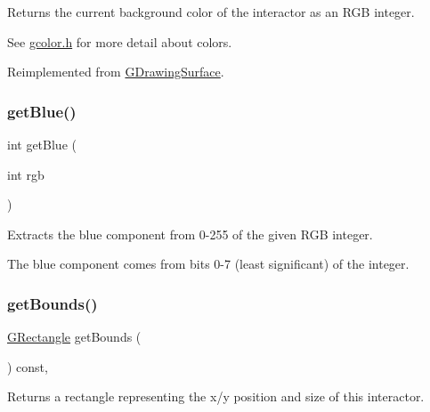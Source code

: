 Returns the current background color of the interactor as an R\+GB integer. 

See \mbox{\hyperlink{gcolor_8h_source}{gcolor.\+h}} for more detail about colors. 

Reimplemented from \mbox{\hyperlink{classsgl_1_1GDrawingSurface_a9e827257a55cb8cf4d9de2ec6bcfd7a0}{G\+Drawing\+Surface}}.

\mbox{\label{classsgl_1_1GCanvas_a9406c01e6961257db37b5dc95945f914}} 
\subsubsection{\texorpdfstring{get\+Blue()}{getBlue()}}
{\footnotesize\ttfamily int get\+Blue (\begin{DoxyParamCaption}\item[{int}]{rgb }\end{DoxyParamCaption})\hspace{0.3cm}{\ttfamily [static]}}



Extracts the blue component from 0-\/255 of the given R\+GB integer. 

The blue component comes from bits 0-\/7 (least significant) of the integer. \mbox{\label{classsgl_1_1GInteractor_a29e6ac35a0b48f491a4c88194cc5da3b}} 
\subsubsection{\texorpdfstring{get\+Bounds()}{getBounds()}}
{\footnotesize\ttfamily \mbox{\hyperlink{structsgl_1_1GRectangle}{G\+Rectangle}} get\+Bounds (\begin{DoxyParamCaption}{ }\end{DoxyParamCaption}) const\hspace{0.3cm}{\ttfamily [virtual]}, {\ttfamily [inherited]}}



Returns a rectangle representing the x/y position and size of this interactor. 

\mbox{\label{classsgl_1_1GInteractor_aa061dfa488c31e18549d64363c1d0e34}} 
